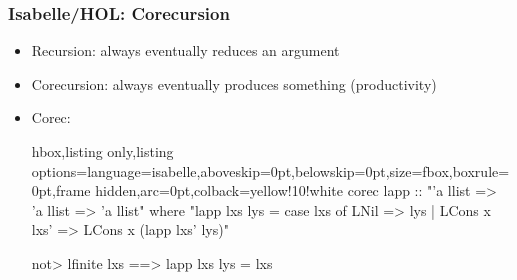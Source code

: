 \documentclass[aspectratio=169,10pt]{beamer}
\begin{document}
\begin{frame}[fragile]
  \frametitle{Isabelle/HOL: Corecursion}
  \begin{itemize}
    \item Recursion: always eventually reduces an argument
    \item Corecursion: always eventually produces something (productivity)
          \pause
    \item Corec:
          \vspace*{-1ex}
          \begin{tcblisting}{hbox,listing only,listing options={language=isabelle,aboveskip=0pt,belowskip=0pt},size=fbox,boxrule=0pt,frame hidden,arc=0pt,colback=yellow!10!white}
corec lapp :: "'a llist => 'a llist => 'a llist" where
"lapp lxs lys = case lxs of LNil => lys | LCons x lxs' => LCons x (lapp lxs' lys)"

\<not> lfinite lxs ==> lapp lxs lys = lxs
          \end{tcblisting}
          \vspace*{-1ex}
  \end{itemize}
\end{frame}
\end{document}
